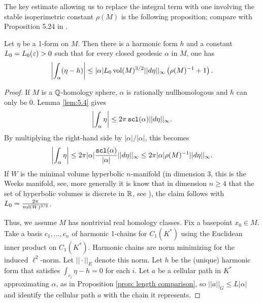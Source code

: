 The key estimate allowing us to replace the integral term with one involving the stable isoperimetric constant $\rho(M)$ is the following proposition; compare with Proposition 5.24 in \cite{LS}.

\begin{prop} \label{prop:5.5} Let $\eta$ be a 1-form on $M$. Then there is a harmonic form $h$ and a constant $L_0 = L_0(\varepsilon)>0$ such that for every closed geodesic $\alpha$ in $M$, one has $$\left|\int_{\alpha}(\eta - h)\right|\leq |\alpha| L_0\operatorname{vol}(M)^{3/2} ||d\eta||_{\infty}\left(\rho(M)^{-1} + 1 \right).$$
\end{prop}
\begin{proof}

If $M$ is a ${\mathbb Q}$-homology sphere, $\alpha$ is rationally nullhomologous and $h$ can only be 0. Lemma \ref{lem:5.4} gives $$\left|\int_{\alpha}\eta\right|\leq 2\pi\operatorname{{\tt{scl}}}(\alpha)||d\eta||_{\infty}.$$
By multiplying the right-hand side by $|\alpha|/|\alpha|$, this becomes $$ \left|\int_{\alpha}\eta\right|\leq 2\pi |\alpha|\frac{\operatorname{{\tt{scl}}}(\alpha)}{|\alpha|}||d\eta||_{\infty}\leq 2\pi|\alpha|\rho(M)^{-1}||d\eta||_{\infty}.$$
If $W$ is the minimal volume hyperbolic $n$-manifold (in dimension 3, this is the Weeks manifold, see\cite{minvol}, more generally it is know that in dimension $n\geq4$ that the set of hyperbolic volumes is discrete in $\mathbb R$, see \cite{minvol2}), the claim follows with $L_0 = \frac{2\pi}{\operatorname{vol}(W)^{3/2}}$.

Thus, we assume $M$ has nontrivial real homology classes. Fix a basepoint $x_0\in M$. Take a basis $c_1,\dots, c_n$ of harmonic 1-chains for  $C_1(K^*)$ using the Euclidean inner product on $C_1(K^*)$. Harmonic chains are norm minimizing for the induced $\ell^2$-norm. Let $||\cdot||_E$ denote this norm. Let $h$ be the (unique) harmonic form that satisfies $\int_{c_i}\eta - h = 0$ for each $i$. Let $a$ be a cellular path in $K^*$ approximating $\alpha$, as in Proposition \ref{prop: length comparison}, so $||a||_G \leq L|\alpha|$ and identify the cellular path $a$ with the chain it represents.


\end{proof}
